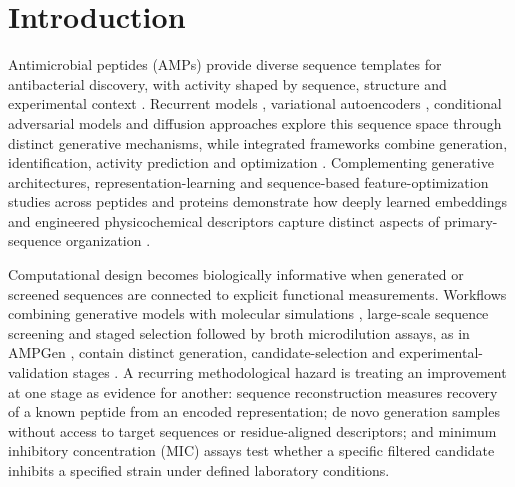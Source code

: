 \documentclass[unnumsec,webpdf,contemporary,large]{oup-authoring-template}
\newcommand{\rev}[1]{#1}
\begin{document}
\section{Introduction}

Antimicrobial peptides (AMPs) provide diverse sequence templates for antibacterial discovery, with activity shaped by sequence, structure and experimental context \cite{ref50,ref51}. Recurrent models \cite{ref1}, variational autoencoders \cite{ref16,ref17,ref2}, conditional adversarial models \cite{ref15,ref19} and diffusion approaches \cite{ref9,ref11,ref20} explore this sequence space through distinct generative mechanisms, while integrated frameworks combine generation, identification, activity prediction and optimization \cite{ref21}. \rev{Complementing generative architectures, representation-learning and sequence-based feature-optimization studies across peptides and proteins demonstrate how deeply learned embeddings and engineered physicochemical descriptors capture distinct aspects of primary-sequence organization \cite{refLe2022,refLe2021,refAMPScanner}.}

Computational design becomes biologically informative when generated or screened sequences are connected to explicit functional measurements. Workflows combining generative models with molecular simulations \cite{ref14,refCao2023}, large-scale sequence screening \cite{ref22} and staged selection followed by broth microdilution assays, as in AMPGen \cite{ref9}, contain distinct generation, candidate-selection and experimental-validation stages \cite{ref25}. A recurring methodological hazard is treating an improvement at one stage as evidence for another: sequence reconstruction measures recovery of a known peptide from an encoded representation; de novo generation samples without access to target sequences or residue-aligned descriptors; and minimum inhibitory concentration (MIC) assays test whether a specific filtered candidate inhibits a specified strain under defined laboratory conditions.
\end{document}
